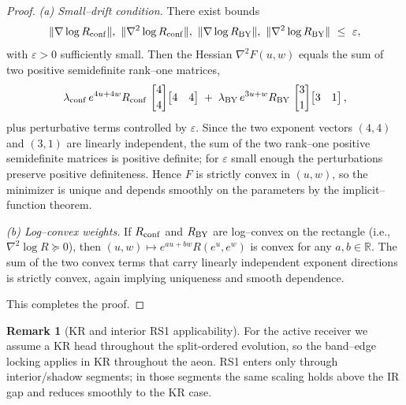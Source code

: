 \documentclass[10pt]{article}
\theoremstyle{definition}
\newtheorem{remark}{Remark}[section]
\theoremstyle{plain}
\begin{document}
\begin{proof}
\emph{(a) Small–drift condition.} There exist bounds
\[
\|\nabla\log R_{\rm conf}\|,\ \|\nabla^2\log R_{\rm conf}\|,\ 
\|\nabla\log R_{\rm BY}\|,\ \|\nabla^2\log R_{\rm BY}\|\ \le\ \varepsilon,
\]
with $\varepsilon>0$ sufficiently small. Then the Hessian $\nabla^2 F(u,w)$ equals the sum of two positive semidefinite rank–one matrices,
\[
\lambda_{\rm conf}\,e^{4u+4w}R_{\rm conf}\,\begin{bmatrix}4\\[2pt]4\end{bmatrix}\!\begin{bmatrix}4&4\end{bmatrix}
\;+\;
\lambda_{\rm BY}\,e^{3u+w}R_{\rm BY}\,\begin{bmatrix}3\\[2pt]1\end{bmatrix}\!\begin{bmatrix}3&1\end{bmatrix},
\]
plus perturbative terms controlled by $\varepsilon$. Since the two exponent vectors $(4,4)$ and $(3,1)$ are linearly independent, the sum of the two rank–one positive semidefinite matrices is positive definite; for $\varepsilon$ small enough the perturbations preserve positive definiteness. Hence $F$ is strictly convex in $(u,w)$, so the minimizer is unique and depends smoothly on the parameters by the implicit–function theorem.

\emph{(b) Log–convex weights.} If $R_{\rm conf}$ and $R_{\rm BY}$ are log–convex on the rectangle (i.e., $\nabla^2\log R\succcurlyeq 0$), then $(u,w)\mapsto e^{au+bw}R(e^u,e^w)$ is convex for any $a,b\in\mathbb R$. The sum of the two convex terms that carry linearly independent exponent directions is strictly convex, again implying uniqueness and smooth dependence.

\medskip
This completes the proof.
\end{proof}

\begin{remark}[KR and interior RS1 applicability]
\label{rem:uom-main-006}
For the active receiver we assume a KR head throughout the split-ordered evolution, so the band--edge locking applies in KR
throughout the aeon. RS1 enters only through interior/shadow segments; in those segments the same scaling
holds above the IR gap and reduces smoothly to the KR case.
\end{remark}

\end{document}
